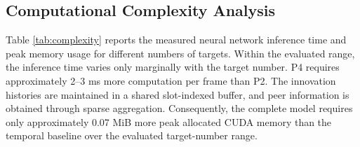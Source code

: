 \documentclass[10pt,doublecolumn]{IEEEtaes}
\begin{document}
\begin{table}[h!]
	\centering
	\caption{OSPA errors (m) of all algorithms vs. different \(P_{d}\).}
	\label{tabel:pos_est_monte_carlo_pd}
	\normalsize
\end{table}	

\begin{table}[h!]
	\centering
	\caption{OSPA errors (m) of all algorithms vs. different \(\mu_{c}\).}
	\label{tabel:pos_est_monte_carlo_mu_c}
	\normalsize
\end{table}	


\subsection{Computational Complexity Analysis}

Table \ref{tab:complexity} reports the measured neural network inference time and peak memory usage for different numbers of targets. Within the evaluated range, the inference time varies only marginally with the target number. P4 requires approximately 2--3 ms more computation per frame than P2. The innovation histories are maintained in a shared slot-indexed buffer, and peer information is obtained through sparse aggregation. Consequently, the complete model requires only approximately 0.07 MiB more peak allocated CUDA memory than the temporal baseline over the evaluated target-number range.
\end{document}
